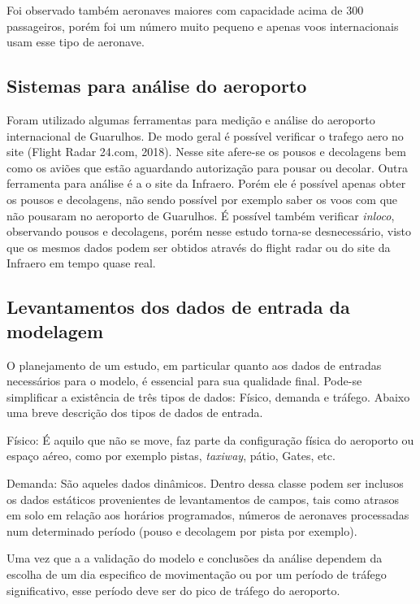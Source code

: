 \documentclass[12pt]{article}
\begin{document}
  Foi observado também aeronaves maiores com capacidade acima de 300 passageiros, porém 
  foi um número muito pequeno e apenas voos internacionais usam esse tipo de aeronave.
  
  \subsection{Sistemas para análise do aeroporto}
  
  Foram utilizado algumas ferramentas para medição e análise do aeroporto 
  internacional de Guarulhos. De modo geral é possível verificar o trafego
  aero no site (Flight Radar 24.com, 2018). Nesse site afere-se os pousos 
  e decolagens bem como os aviões que estão aguardando autorização para pousar
  ou decolar. Outra ferramenta para análise é a o site da Infraero. Porém 
  ele é possível apenas obter os pousos e decolagens, não sendo possível
  por exemplo saber os voos com que não pousaram no aeroporto de Guarulhos.
  É possível também verificar \textit{inloco}, observando pousos e decolagens, porém
  nesse estudo torna-se desnecessário, visto que os mesmos dados podem ser
  obtidos através do flight radar ou do site da Infraero em tempo quase
  real.
  
  \subsection{Levantamentos dos dados de entrada da modelagem}
  
  O planejamento de um estudo, em particular quanto aos dados de entradas
  necessários para o modelo, é essencial para sua qualidade final. Pode-se
  simplificar a existência de três tipos de dados: Físico, demanda e tráfego. 
  Abaixo uma breve descrição dos tipos de dados de entrada.
  
  Físico: É aquilo que não se move, faz parte da configuração física do 
  aeroporto ou espaço aéreo, como por exemplo pistas, \textit{taxiway}, pátio, Gates, etc.
  
  Demanda: São aqueles dados dinâmicos. Dentro dessa classe podem ser inclusos os 
  dados estáticos provenientes de levantamentos de campos, tais como
  atrasos em solo em relação aos horários programados, números de aeronaves
  processadas num determinado período (pouso e decolagem por pista por 
  exemplo).
  
  Uma vez que a a validação do modelo e conclusões da análise dependem da
  escolha de um dia especifico de movimentação ou por um período de tráfego
  significativo, esse período deve ser do pico de tráfego do aeroporto.
  
\end{document}
